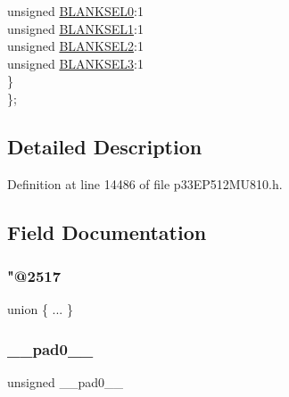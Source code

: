 \begin{DoxyCompactItemize}
\begin{tabbing}
\>\>unsigned \hyperlink{structtag_a_u_x_c_o_n2_b_i_t_s_ac11d96c4da7a19f8070237598aad5779}{BLANKSEL0}:1\\
\>\>unsigned \hyperlink{structtag_a_u_x_c_o_n2_b_i_t_s_a44677be7697055968c0df4a017937ad4}{BLANKSEL1}:1\\
\>\>unsigned \hyperlink{structtag_a_u_x_c_o_n2_b_i_t_s_aded93be63f6e5d719aa8cd84f125f650}{BLANKSEL2}:1\\
\>\>unsigned \hyperlink{structtag_a_u_x_c_o_n2_b_i_t_s_a9a435fdd957a6f0e1b6e67ea964df687}{BLANKSEL3}:1\\
\>\} \\
\}; \\

\end{tabbing}\end{DoxyCompactItemize}


\subsection{Detailed Description}


Definition at line 14486 of file p33\+E\+P512\+M\+U810.\+h.



\subsection{Field Documentation}
\mbox{\label{structtag_a_u_x_c_o_n2_b_i_t_s_a68f8eae351abb8199d7dc77a2f38376f}} 
\subsubsection{\texorpdfstring{"@2517}{@2517}}
{\footnotesize\ttfamily union \{ ... \} }

\mbox{\label{structtag_a_u_x_c_o_n2_b_i_t_s_adf71f3d8410c1f1dbbc96680a92c49af}} 
\subsubsection{\texorpdfstring{\+\_\+\+\_\+pad0\+\_\+\+\_\+}{\_\_pad0\_\_}}
{\footnotesize\ttfamily unsigned \+\_\+\+\_\+pad0\+\_\+\+\_\+}



